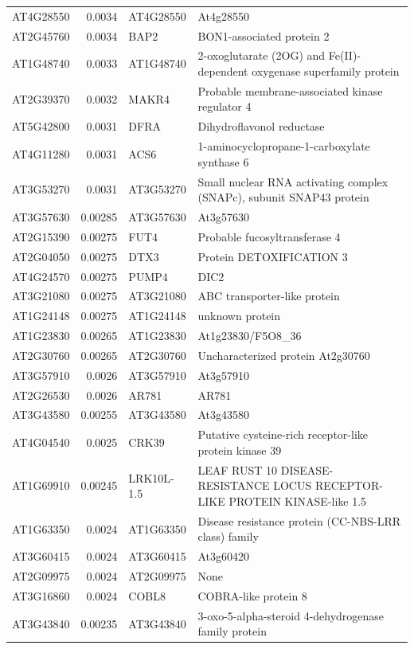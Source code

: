 \documentclass[11pt]{article}
\begin{document}
\begin{center}
\begin{tabular}{lrll}
AT4G28550 & 0.0034 & AT4G28550 & At4g28550\\
AT2G45760 & 0.0034 & BAP2 & BON1-associated protein 2\\
AT1G48740 & 0.0033 & AT1G48740 & 2-oxoglutarate (2OG) and Fe(II)-dependent oxygenase superfamily protein\\
AT2G39370 & 0.0032 & MAKR4 & Probable membrane-associated kinase regulator 4\\
AT5G42800 & 0.0031 & DFRA & Dihydroflavonol reductase\\
AT4G11280 & 0.0031 & ACS6 & 1-aminocyclopropane-1-carboxylate synthase 6\\
AT3G53270 & 0.0031 & AT3G53270 & Small nuclear RNA activating complex (SNAPc), subunit SNAP43 protein\\
AT3G57630 & 0.00285 & AT3G57630 & At3g57630\\
AT2G15390 & 0.00275 & FUT4 & Probable fucosyltransferase 4\\
AT2G04050 & 0.00275 & DTX3 & Protein DETOXIFICATION 3\\
AT4G24570 & 0.00275 & PUMP4 & DIC2\\
AT3G21080 & 0.00275 & AT3G21080 & ABC transporter-like protein\\
AT1G24148 & 0.00275 & AT1G24148 & unknown protein\\
AT1G23830 & 0.00265 & AT1G23830 & At1g23830/F5O8\_36\\
AT2G30760 & 0.00265 & AT2G30760 & Uncharacterized protein At2g30760\\
AT3G57910 & 0.0026 & AT3G57910 & At3g57910\\
AT2G26530 & 0.0026 & AR781 & AR781\\
AT3G43580 & 0.00255 & AT3G43580 & At3g43580\\
AT4G04540 & 0.0025 & CRK39 & Putative cysteine-rich receptor-like protein kinase 39\\
AT1G69910 & 0.00245 & LRK10L-1.5 & LEAF RUST 10 DISEASE-RESISTANCE LOCUS RECEPTOR-LIKE PROTEIN KINASE-like 1.5\\
AT1G63350 & 0.0024 & AT1G63350 & Disease resistance protein (CC-NBS-LRR class) family\\
AT3G60415 & 0.0024 & AT3G60415 & At3g60420\\
AT2G09975 & 0.0024 & AT2G09975 & None\\
AT3G16860 & 0.0024 & COBL8 & COBRA-like protein 8\\
AT3G43840 & 0.00235 & AT3G43840 & 3-oxo-5-alpha-steroid 4-dehydrogenase family protein\\

\end{tabular}
\end{center}
\end{document}
